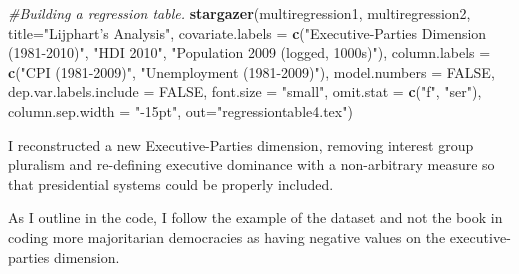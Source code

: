 \documentclass[]{article}
\newenvironment{Shaded}{\begin{snugshade}}{\end{snugshade}}
\newcommand{\CommentTok}[1]{\textcolor[rgb]{0.56,0.35,0.01}{\textit{#1}}}
\newcommand{\DataTypeTok}[1]{\textcolor[rgb]{0.13,0.29,0.53}{#1}}
\newcommand{\KeywordTok}[1]{\textcolor[rgb]{0.13,0.29,0.53}{\textbf{#1}}}
\newcommand{\NormalTok}[1]{#1}
\newcommand{\OtherTok}[1]{\textcolor[rgb]{0.56,0.35,0.01}{#1}}
\newcommand{\StringTok}[1]{\textcolor[rgb]{0.31,0.60,0.02}{#1}}
\begin{document}
\begin{Shaded}
\begin{Highlighting}[]
\CommentTok{#Building a regression table.}
\KeywordTok{stargazer}\NormalTok{(multiregression1, multiregression2, }
          \DataTypeTok{title=}\StringTok{"Lijphart's Analysis"}\NormalTok{, }
          \DataTypeTok{covariate.labels =} \KeywordTok{c}\NormalTok{(}\StringTok{"Executive-Parties Dimension (1981-2010)"}\NormalTok{, }\StringTok{"HDI 2010"}\NormalTok{, }
                               \StringTok{"Population 2009 (logged, 1000s)"}\NormalTok{), }
          \DataTypeTok{column.labels =} \KeywordTok{c}\NormalTok{(}\StringTok{"CPI (1981-2009)"}\NormalTok{, }\StringTok{"Unemployment (1981-2009)"}\NormalTok{), }
          \DataTypeTok{model.numbers =} \OtherTok{FALSE}\NormalTok{, }\DataTypeTok{dep.var.labels.include =} \OtherTok{FALSE}\NormalTok{, }
          \DataTypeTok{font.size =} \StringTok{"small"}\NormalTok{,}
          \DataTypeTok{omit.stat =} \KeywordTok{c}\NormalTok{(}\StringTok{"f"}\NormalTok{, }\StringTok{"ser"}\NormalTok{),}
          \DataTypeTok{column.sep.width =} \StringTok{"-15pt"}\NormalTok{, }\DataTypeTok{out=}\StringTok{"regressiontable4.tex"}\NormalTok{)}
\end{Highlighting}
\end{Shaded}

I reconstructed a new Executive-Parties dimension, removing interest
group pluralism and re-defining executive dominance with a non-arbitrary
measure so that presidential systems could be properly included.

As I outline in the code, I follow the example of the dataset and not
the book in coding more majoritarian democracies as having negative
values on the executive-parties dimension.
\end{document}
